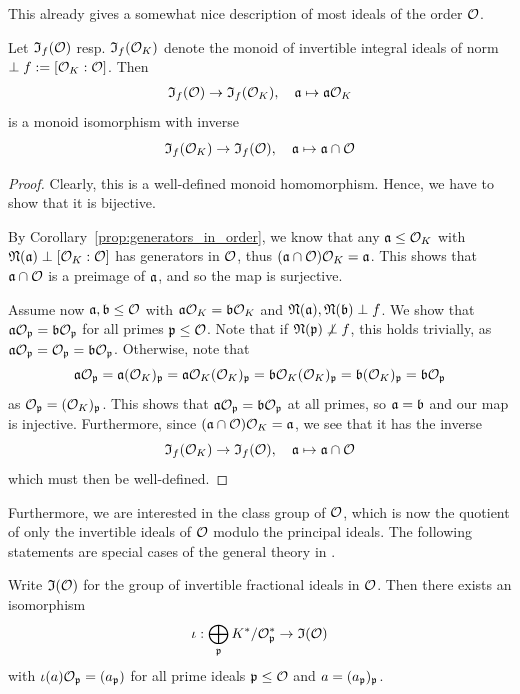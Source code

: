 This already gives a somewhat nice description of most ideals of the order $\mathcal{O}$.
\begin{prop}
    \label{prop:coprime_ideals_order}
    Let $\mathfrak{I}_f(\mathcal{O})$ resp. $\mathfrak{I}_f(\mathcal{O}_K)$ denote the monoid of invertible integral ideals of norm $\perp f := [\mathcal{O}_K : \mathcal{O}]$.
    Then
    \begin{align*}
        \mathfrak{I}_f(\mathcal{O}) \to \mathfrak{I}_f(\mathcal{O}_K), \quad \mathfrak{a} \mapsto \mathfrak{a}\mathcal{O}_K
    \end{align*}
    is a monoid isomorphism with inverse
    \begin{equation*}
        \mathfrak{I}_f(\mathcal{O}_K) \to \mathfrak{I}_f(\mathcal{O}), \quad \mathfrak{a} \mapsto \mathfrak{a} \cap \mathcal{O}
    \end{equation*}
\end{prop}
\begin{proof}
    Clearly, this is a well-defined monoid homomorphism.
    Hence, we have to show that it is bijective.

    By Corollary~\ref{prop:generators_in_order}, we know that any $\mathfrak{a} \leq \mathcal{O}_K$ with $\mathfrak{N}(\mathfrak{a}) \perp [\mathcal{O}_K : \mathcal{O}]$ has generators in $\mathcal{O}$, thus $(\mathfrak{a} \cap \mathcal{O})\mathcal{O}_K = \mathfrak{a}$.
    This shows that $\mathfrak{a} \cap \mathcal{O}$ is a preimage of $\mathfrak{a}$, and so the map is surjective. 

    Assume now $\mathfrak{a}, \mathfrak{b} \leq \mathcal{O}$ with $\mathfrak{a}\mathcal{O}_K = \mathfrak{b}\mathcal{O}_K$ and $\mathfrak{N}(\mathfrak{a}), \mathfrak{N}(\mathfrak{b}) \perp f$.
    We show that $\mathfrak{a}\mathcal{O}_{\mathfrak{p}} = \mathfrak{b}\mathcal{O}_{\mathfrak{p}}$ for all primes $\mathfrak{p} \leq \mathcal{O}$.
    Note that if $\mathfrak{N}(\mathfrak{p}) \not\perp f$, this holds trivially, as $\mathfrak{a}\mathcal{O}_{\mathfrak{p}} = \mathcal{O}_{\mathfrak{p}} = \mathfrak{b}\mathcal{O}_{\mathfrak{p}}$.
    Otherwise, note that
    \begin{equation*}
        \mathfrak{a}\mathcal{O}_{\mathfrak{p}} = \mathfrak{a} (\mathcal{O}_K)_{\mathfrak{p}} = \mathfrak{a}\mathcal{O}_K(\mathcal{O}_K)_{\mathfrak{p}} = \mathfrak{b}\mathcal{O}_K(\mathcal{O}_K)_{\mathfrak{p}} = \mathfrak{b} (\mathcal{O}_K)_{\mathfrak{p}} = \mathfrak{b}\mathcal{O}_{\mathfrak{p}}
    \end{equation*}
    as $\mathcal{O}_{\mathfrak{p}} = (\mathcal{O}_K)_{\mathfrak{p}}$.
    This shows that $\mathfrak{a}\mathcal{O}_{\mathfrak{p}} = \mathfrak{b}\mathcal{O}_{\mathfrak{p}}$ at all primes, so $\mathfrak{a} = \mathfrak{b}$ and our map is injective.
    Furthermore, since $(\mathfrak{a} \cap \mathcal{O})\mathcal{O}_K = \mathfrak{a}$, we see that it has the inverse
    \begin{equation*}
        \mathfrak{I}_f(\mathcal{O}_K) \to \mathfrak{I}_f(\mathcal{O}), \quad \mathfrak{a} \mapsto \mathfrak{a} \cap \mathcal{O}
    \end{equation*}
    which must then be well-defined.
\end{proof}
Furthermore, we are interested in the class group of $\mathcal{O}$, which is now the quotient of only the invertible ideals of $\mathcal{O}$ modulo the principal ideals.
The following statements are special cases of the general theory in \cite[Chapter I.§12]{neukirch}.
\begin{lemma}
    \label{prop:invertible_ideal_characterization}
    Write $\mathfrak{I}(\mathcal{O})$ for the group of invertible fractional ideals in $\mathcal{O}$.
    Then there exists an isomorphism
    \begin{equation*}
        \iota: \bigoplus_{\mathfrak{p}} K^*/\mathcal{O}_{\mathfrak{p}}^* \to \mathfrak{I}(\mathcal{O})
    \end{equation*}
    with $\iota(a)\mathcal{O}_{\mathfrak{p}} = (a_{\mathfrak{p}})$ for all prime ideals $\mathfrak{p} \leq \mathcal{O}$ and $a = (a_{\mathfrak{p}})_{\mathfrak{p}}$.
\end{lemma}
